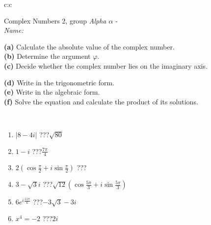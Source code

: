 \documentclass[10pt]{report}
\begin{document}
\thispagestyle{empty}
\begin{tabular}{c:c}
\begin{minipage}[c][104.5mm][t]{0.5\linewidth}
\begin{center}
\vspace{5mm}
{\huge Complex Numbers 2, group \textit{Alpha $\alpha$} -}\\[5mm]
\textit{Name:}\phantom{xxxxxxxxxxxxxxxxxxxxxxxxxxxxxxxxxxxxxxxxxxxxxxxxxxxxxxxxxxxxxxxxx}\\[5mm]
\begin{minipage}{0.95\linewidth}
\begin{center}
{\small \begin{minipage}{0.44\textwidth} \raggedright
\textbf{(a)} Calculate the absolute value of the complex number. \\[1mm]
\textbf{(b)} Determine the argument \(\varphi\). \\[1mm]
\textbf{(c)} Decide whether the complex number lies on the imaginary axis. \end{minipage} \begin{minipage}{0.54\textwidth}
\textbf{(d)} Write in the trigonometric form. \\[1mm]
\textbf{(e)} Write in the algebraic form. \\[1mm]
\textbf{(f)} Solve the equation and calculate the product of its solutions.
\end{minipage}
}
\end{center}
\end{minipage}
\\[1mm]
\begin{minipage}{0.79\linewidth}
\begin{center}
\begin{varwidth}{\linewidth}
\setlength{\itemsep}{0pt}
\begin{enumerate}
\large
\item $|8-4i|$\quad \dotfill\; ???\;\dotfill \quad $\sqrt{80}$
\item $1-i$\quad \dotfill\; ???\;\dotfill \quad $\frac{7\pi}{4}$
\item $2\left(\cos{\frac{\pi}{2}}+i\sin{\frac{\pi}{2}}\right)$\quad \dotfill\; ???\;\dotfill \quad {}
\item $3-\sqrt{3}i$\quad \dotfill\; ???\;\dotfill \quad $\sqrt{12}\left(\cos{\frac{5\pi}{3}}+i\sin{\frac{5\pi}{3}}\right)$
\item $6e^{i\frac{11\pi}{6}}$\quad \dotfill\; ???\;\dotfill \quad $-3\sqrt{3}-3i$
\item $x^4=-2$\quad \dotfill\; ???\;\dotfill \quad $2i$

\end{enumerate}
\end{varwidth}
\end{center}
\end{minipage}
\end{center}
\end{minipage}
\end{tabular}
\end{document}

